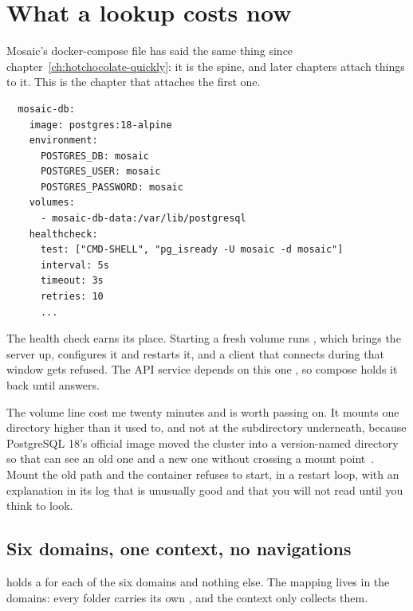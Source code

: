 \section{What a lookup costs now}
\label{sec:ch04-what-a-lookup-costs}

Mosaic's docker-compose file has said the same thing since
chapter~\ref{ch:hotchocolate-quickly}: it is the spine, and later chapters
attach things to it. This is the chapter that attaches the first one.

\begin{verbatim}
  mosaic-db:
    image: postgres:18-alpine
    environment:
      POSTGRES_DB: mosaic
      POSTGRES_USER: mosaic
      POSTGRES_PASSWORD: mosaic
    volumes:
      - mosaic-db-data:/var/lib/postgresql
    healthcheck:
      test: ["CMD-SHELL", "pg_isready -U mosaic -d mosaic"]
      interval: 5s
      timeout: 3s
      retries: 10
      ...
\end{verbatim}

%
The health check earns its place. Starting a fresh volume runs ,
which brings the server up, configures it and restarts it, and a client that
connects during that window gets refused. The API service depends on this one
, so compose holds it back until
 answers.

The volume line cost me twenty minutes and is worth passing on. It mounts one
directory higher than it used to, and not at the  subdirectory
underneath, because PostgreSQL 18's official image moved the cluster into a
version-named directory so that  can see an old one and a new
one without crossing a mount point~\autocite{dockerlibrary2026postgres18}. Mount
the old path and the container refuses to start, in a restart loop, with an
explanation in its log that is unusually good and that you will not read until
you think to look.

\subsection*{Six domains, one context, no navigations}

%
 holds a  for each of the six domains and
nothing else. The mapping lives in the domains: every folder carries its own
, and the context only collects them.

